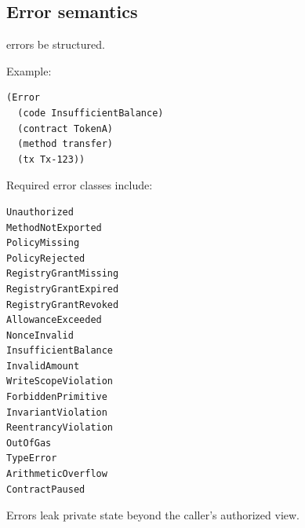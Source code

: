 



\subsection{Error semantics}

\SCS{} errors \SHOULD{} be structured.

Example:

\begin{lstlisting}
(Error
  (code InsufficientBalance)
  (contract TokenA)
  (method transfer)
  (tx Tx-123))
\end{lstlisting}

Required error classes include:

\begin{lstlisting}
Unauthorized
MethodNotExported
PolicyMissing
PolicyRejected
RegistryGrantMissing
RegistryGrantExpired
RegistryGrantRevoked
AllowanceExceeded
NonceInvalid
InsufficientBalance
InvalidAmount
WriteScopeViolation
ForbiddenPrimitive
InvariantViolation
ReentrancyViolation
OutOfGas
TypeError
ArithmeticOverflow
ContractPaused
\end{lstlisting}

Errors \MUSTNOT{} leak private state beyond the caller's authorized view.

